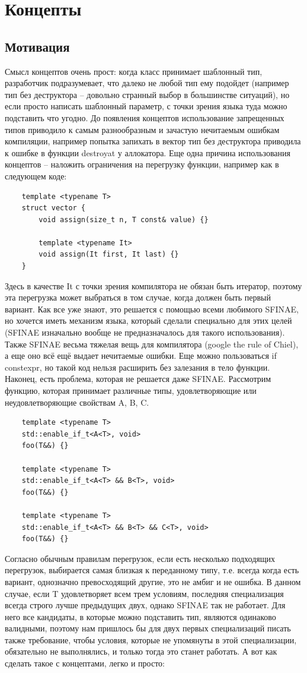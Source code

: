 \documentclass[12pt, a4paper]{article}
\begin{document}
\section{Концепты}
\subsection{Мотивация}
Смысл концептов очень прост: когда класс принимает шаблонный тип, разработчик подразумевает, что далеко не любой тип ему подойдет (например тип без деструктора -- довольно странный выбор в большинстве ситуаций), но если просто написать шаблонный параметр, с точки зрения языка туда можно подставить что угодно. До появления концептов использование запрещенных типов приводило к самым разнообразным и зачастую нечитаемым ошибкам компиляции, например попытка запихать в вектор тип без деструктора приводила к ошибке в функции destroy\textunderscore at у аллокатора. Еще одна причина использования концептов -- наложить ограничения на перегрузку функции, например как в следующем коде:
\begin{verbatim}
	template <typename T>
	struct vector {
		void assign(size_t n, T const& value) {}
		
		template <typename It>
		void assign(It first, It last) {}
	}
\end{verbatim}
Здесь в качестве It с точки зрения компилятора не обязан быть итератор, поэтому эта перегрузка может выбраться в том случае, когда должен быть первый вариант. Как все уже знают, это решается с помощью всеми любимого SFINAE, но хочется иметь механизм языка, который сделали специально для этих целей (SFINAE изначально вообще не предназначалось для такого использования). Также SFINAE весьма тяжелая вещь для компилятора (google the rule of Chiel), а еще оно всё ещё выдает нечитаемые ошибки. Еще можно пользоваться if constexpr, но такой код нельзя расширить без залезания в тело функции. Наконец, есть проблема, которая не решается даже SFINAE. Рассмотрим функцию, которая принимает различные типы, удовлетворяющие или неудовлетворяющие свойствам A, B, C.
\begin{verbatim}
	template <typename T>
	std::enable_if_t<A<T>, void> 
	foo(T&&) {}
	
	template <typename T>
	std::enable_if_t<A<T> && B<T>, void> 
	foo(T&&) {}
	
	template <typename T>
	std::enable_if_t<A<T> && B<T> && C<T>, void>
	foo(T&&) {}
\end{verbatim}
Согласно обычным правилам перегрузок, если есть несколько подходящих перегрузок, выбирается самая близкая к переданному типу, т.е. всегда когда есть вариант, однозначно превосходящий другие, это не амбиг и не ошибка. В данном случае, если T удовлетворяет всем трем условиям, последняя специализация всегда строго лучше предыдущих двух, однако SFINAE так не работает. Для него все кандидаты, в которые можно подставить тип, являются одинаково валидными, поэтому нам пришлось бы для двух первых специализаций писать также требование, чтобы условия, которые не упомянуты в этой специализации, обязательно не выполнялись, и только тогда это станет работать. А вот как сделать такое с концептами, легко и просто:
\end{document}
